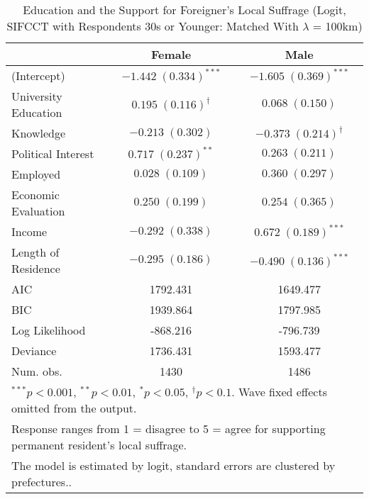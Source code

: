 
\begin{table}
\caption{Education and the Support for Foreigner's Local Suffrage (Logit, SIFCCT with Respondents 30s or Younger: Matched With $\lambda$ = 100km)}
\begin{center}
\begin{tabular}{l c c }
\toprule
 & Female & Male \\
\midrule
(Intercept)          & $-1.442 \; (0.334)^{***}$    & $-1.605 \; (0.369)^{***}$     \\
University Education & $0.195 \; (0.116)^{\dagger}$ & $0.068 \; (0.150)$            \\
Knowledge            & $-0.213 \; (0.302)$          & $-0.373 \; (0.214)^{\dagger}$ \\
Political Interest   & $0.717 \; (0.237)^{**}$      & $0.263 \; (0.211)$            \\
Employed             & $0.028 \; (0.109)$           & $0.360 \; (0.297)$            \\
Economic Evaluation  & $0.250 \; (0.199)$           & $0.254 \; (0.365)$            \\
Income               & $-0.292 \; (0.338)$          & $0.672 \; (0.189)^{***}$      \\
Length of Residence  & $-0.295 \; (0.186)$          & $-0.490 \; (0.136)^{***}$     \\
\midrule
AIC                  & 1792.431                     & 1649.477                      \\
BIC                  & 1939.864                     & 1797.985                      \\
Log Likelihood       & -868.216                     & -796.739                      \\
Deviance             & 1736.431                     & 1593.477                      \\
Num. obs.            & 1430                         & 1486                          \\
\bottomrule
\multicolumn{3}{l}{\scriptsize{$^{***}p<0.001$, $^{**}p<0.01$, $^*p<0.05$, $^{\dagger}p<0.1$. Wave fixed effects omitted from the output.}} \\ \multicolumn{3}{l}{\scriptsize{Response ranges from 1 = disagree to 5 = agree for supporting permanent resident's local suffrage.}} \\ \multicolumn{3}{l}{\scriptsize{The model is estimated by logit, standard errors are clustered by prefectures..}}
\end{tabular}
\label{lgtab_smo_m3}
\end{center}
\end{table}


